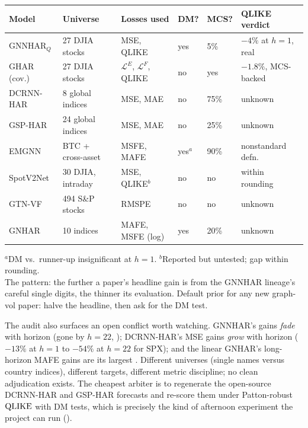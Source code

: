 \begin{keyresult}
\begin{center}
\small
\begin{tabular}{@{}llllll@{}}
\toprule
Model & Universe & Losses used & DM? & MCS? & QLIKE verdict \\
\midrule
GNNHAR$_Q$ & 27 DJIA stocks & MSE, QLIKE & yes & 5\% & $-4\%$ at $h{=}1$, real \\
GHAR (cov.) & 27 DJIA stocks & $\mathcal{L}^E$, $\mathcal{L}^F$, QLIKE & no & yes & $-1.8\%$, MCS-backed \\
DCRNN-HAR & 8 global indices & MSE, MAE & no & 75\% & unknown \\
GSP-HAR & 24 global indices & MSE, MAE & no & 25\% & unknown \\
EMGNN & BTC + cross-asset & MSFE, MAFE & yes$^{a}$ & 90\% & nonstandard defn. \\
SpotV2Net & 30 DJIA, intraday & MSE, QLIKE$^{b}$ & no & no & within rounding \\
GTN-VF & 494 S\&P stocks & RMSPE & no & no & unknown \\
GNHAR & 10 indices & MAFE, MSFE (log) & yes & 20\% & unknown \\
\bottomrule
\end{tabular}
\end{center}
\footnotesize $^{a}$DM vs.\ runner-up insignificant at $h=1$. $^{b}$Reported but untested; gap within rounding.\\[2pt]
\normalsize The pattern: the further a paper's headline gain is from the GNNHAR lineage's careful single digits, the thinner its evaluation. Default prior for any new graph-vol paper: halve the headline, then ask for the DM test.
\end{keyresult}

The audit also surfaces an open conflict worth watching. GNNHAR's gains \emph{fade} with horizon (gone by $h=22$, ); DCRNN-HAR's MSE gains \emph{grow} with horizon ($-13\%$ at $h=1$ to $-54\%$ at $h=22$ for SPX); and the linear GNHAR's long-horizon MAFE gains are its largest \citep{BoettiNunes2026}. Different universes (single names versus country indices), different targets, different metric discipline; no clean adjudication exists. The cheapest arbiter is to regenerate the open-source DCRNN-HAR and GSP-HAR forecasts and re-score them under Patton-robust $\operatorname{QLIKE}$ with DM tests, which is precisely the kind of afternoon experiment the project can run ().

